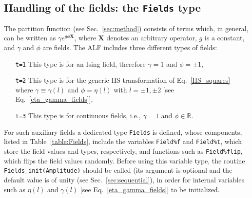 \subsection{Handling of the fields: the \texttt{Fields} type} \label{sec:fields}

The partition function (see Sec.~\ref{sec:method}) consists of terms which, in general, can be written as $\gamma e^{g \phi \bm{X} }$, where $\bm{X}$ denotes an arbitrary operator, $g$ is a constant, and $\gamma$ and $\phi$ are fields. 
The ALF includes three different types of fields:
\begin{itemize}
\item[\texttt{t=1}]   This type is for an  Ising field, therefore $\gamma= 1$ and $ \phi = \pm 1$,
\item[\texttt{t=2}]   This type is for the generic HS  transformation of Eq.~\eqref{HS_squares} where  $\gamma \equiv \gamma(l) $  and $ \phi = \eta(l)$  with $l = \pm 1, \pm 2$ [see Eq.~\eqref{eta_gamma_fields}],
\item[\texttt{t=3}]   This type is for continuous fields, i.e., $\gamma= 1$  and $ \phi  \in \mathbb{R}$.
\end{itemize}

For such auxiliary fields a dedicated type \texttt{Fields} is defined, whose components, listed in Table~\ref{table:Fields}, include the variables \texttt{Field\%f} and \texttt{Field\%t}, which store the field values and types, respectively, and functions such as \texttt{Field\%flip}, which flips the field values randomly. Before using this variable type, the routine \texttt{Fields\_init(Amplitude)} should be called (its argument is optional and the default value is of unity (see Sec.~\ref{sec:sequential}), in order for internal variables such as  $\eta(l)$ and $\gamma(l)$  [see Eq.~\eqref{eta_gamma_fields}] to be initialized.


